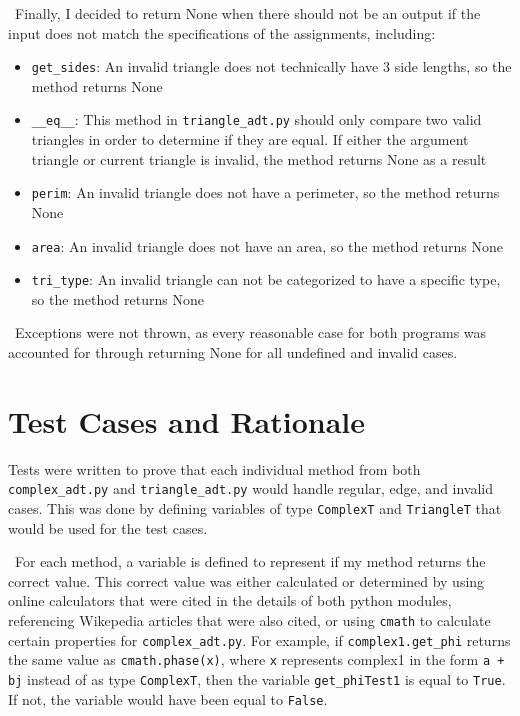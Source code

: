 \documentclass[12pt]{article}
\begin{document}
~\newline\noindent Finally, I decided to return None when there should not be an output if the input does not match the specifications of the assignments, including:
\begin{itemize}
	\item \verb |get_sides|: An invalid triangle does not technically have 3 side lengths, so the method returns None
	\item \verb |__eq__|: This method in \verb |triangle_adt.py| should only compare two valid triangles in order to determine if they are equal. If either the argument triangle or current triangle is invalid, the method returns None as a result
	\item \verb |perim|: An invalid triangle does not have a perimeter, so the method returns None
	\item \verb |area|: An invalid triangle does not have an area, so the method returns None
	\item \verb |tri_type|: An invalid triangle can not be categorized to have a specific type, so the method returns None 
\end{itemize}

~\newline\noindent Exceptions were not thrown, as every reasonable case for both programs was accounted for through returning None for all undefined and invalid cases.

\section{Test Cases and Rationale} \label{Testing}

Tests were written to prove that each individual method from both \verb |complex_adt.py| and \verb |triangle_adt.py| would handle regular, edge, and invalid cases. This was done by defining variables of type \verb |ComplexT| and \verb |TriangleT| that would be used for the test cases. 

~\newline\noindent For each method, a variable is defined to represent if my method returns the correct value. This correct value was either calculated or determined by using online calculators that were cited in the details of both python modules, referencing Wikepedia articles that were also cited, or using \verb |cmath| to calculate certain properties for \verb |complex_adt.py|. For example, if \verb |complex1.get_phi| returns the same value as \verb |cmath.phase(x)|, where \verb |x| represents complex1 in the form \verb |a + bj| instead of as type \verb |ComplexT|, then the variable \verb |get_phiTest1| is equal to \verb |True|. If not, the variable would have been equal to \verb |False|. 
\end{document}
